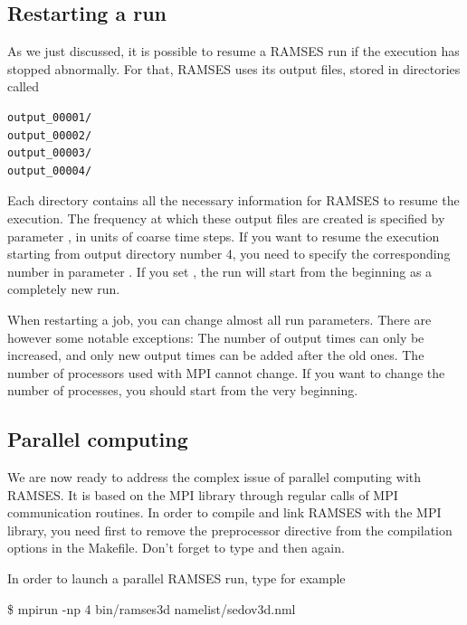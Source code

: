 \subsection{Restarting a run}

As we just discussed, it is possible to resume a RAMSES run if the
execution has stopped abnormally. For that, RAMSES uses its output
files, stored in directories called

\begin{Verbatim}
output_00001/
output_00002/
output_00003/
output_00004/
\end{Verbatim}

Each directory contains all the necessary information for RAMSES to
resume the execution. The frequency at which these output files are
created is specified by parameter , in units of coarse
time steps. If you want to resume the execution starting from output
directory number 4, you need to specify the corresponding number in
parameter . If you set
, the run will start from the beginning as a
completely new run. 

\begin{warning}
When restarting a job, you can change almost all run parameters. There
are however some notable exceptions: The number of output times can only
be increased, and only new output times can be added after the old ones.
The number of processors used with MPI cannot change. If you want to
change the number of processes, you should start from the very
beginning.
\end{warning}

\subsection{Parallel computing}

We are now ready to address the complex issue of parallel computing
with RAMSES. It is based on the MPI library through regular calls of MPI
communication routines. In order to compile and link RAMSES with the MPI
library, you need first to remove the preprocessor directive
 from the compilation options in the Makefile.
Don't forget to type  and then  again.

In order to launch a parallel RAMSES run, type for example

\begin{Prompt}
\$ mpirun -np 4 bin/ramses3d namelist/sedov3d.nml 
\end{Prompt}

